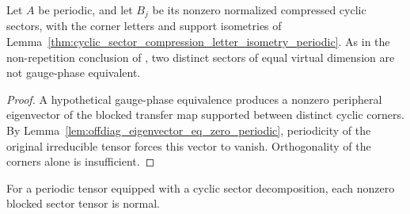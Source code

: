 \begin{lemma}
    \label{lem:periodic_cyclic_sectors_inequivalent}
    \leanok
    Let $A$ be periodic, and let $B_j$ be its nonzero normalized compressed
    cyclic sectors, with the corner letters and support isometries of
    Lemma~\ref{thm:cyclic_sector_compression_letter_isometry_periodic}.
    As in the non-repetition conclusion of
    \cite[Lemma~\emph{bdcf}, lines~404--423]{DeLasCuevas2017Irreducible}, two
    distinct sectors of equal virtual dimension are not gauge-phase equivalent.
\end{lemma}
\begin{proof}\leanok
    A hypothetical gauge-phase equivalence produces a nonzero peripheral
    eigenvector of the blocked transfer map supported between distinct cyclic
    corners. By Lemma~\ref{lem:offdiag_eigenvector_eq_zero_periodic},
    periodicity of the original irreducible tensor forces this vector to
    vanish. Orthogonality of the corners alone is insufficient.
\end{proof}

\begin{lemma}\label{lem:sector_blocked_normal_periodic}
    \leanok
    For a periodic tensor equipped with a cyclic sector decomposition,
    each nonzero blocked sector tensor is normal.
\end{lemma}


